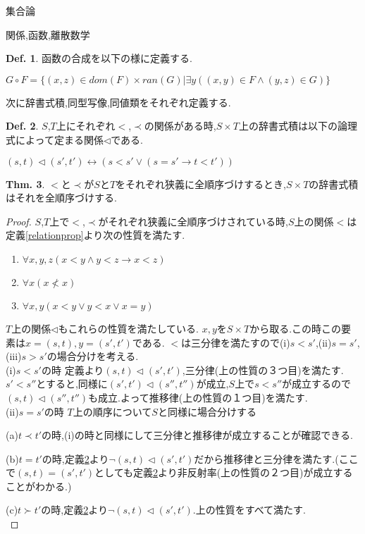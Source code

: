 \documentclass[14pt]{jsarticle}
\theoremstyle{definition}
\newtheorem{dfn}{Def.}[subsection]
\newtheorem{thm}[dfn]{Thm.}
\begin{document}
\begin{section}{集合論}
\begin{subsection}{関係,函数,離散数学}
\begin{dfn}
\label{funccomp}
函数の合成を以下の様に定義する.\par
$G \circ F = \{(x,z)\in dom(F) \times ran(G)|\exists y((x,y)\in F \land (y,z) \in G)\}$
\end{dfn}
次に辞書式積,同型写像,同値類をそれぞれ定義する.
\begin{dfn}
\label{dictcardef}
$S$,$T$上にそれぞれ$<$,$\prec$の関係がある時,$S\times T$上の辞書式積は以下の論理式によって定まる関係$\triangleleft$である.\par
$(s,t) \triangleleft (s',t') \leftrightarrow (s<s' \lor(s=s'\to t<t'))$
\end{dfn}
\begin{thm}
\label{dictstrict}
$<$と$\prec$が$S$と$T$をそれぞれ狭義に全順序づけするとき,$S\times T$の辞書式積はそれを全順序づけする.
\end{thm}
\begin{proof}
$S$,$T$上で$<$,$\prec$がそれぞれ狭義に全順序づけされている時,$S$上の関係$<$は定義\ref{relationprop}より次の性質を満たす.
\begin{enumerate}
	\item $\forall x,y,z(x<y \land y<z \to x<z)$
	\item $\forall x(x \not < x)$
	\item $\forall x,y(x<y \lor y<x \lor x=y)$
\end{enumerate}
$T$上の関係$\triangleleft$もこれらの性質を満たしている.
$x,y$を$S \times T$から取る.この時この要素は$x=(s,t),y=(s',t')$である.
$<$は三分律を満たすので(i)$s<s'$,(ii)$s=s'$,(iii)$s>s'$の場合分けを考える.\\
(i)$s<s'$の時
定義より$(s,t) \triangleleft(s',t')$,三分律(上の性質の３つ目)を満たす.
$s'<s''$とすると,同様に$(s',t') \triangleleft (s'',t'')$が成立,$S$上で$s<s''$が成立するので$(s,t) \triangleleft (s'',t'')$も成立.よって推移律(上の性質の１つ目)を満たす.\\
(ii)$s=s'$の時
$T$上の順序について$S$と同様に場合分けする\par
(a)$t\prec t'$の時,(i)の時と同様にして三分律と推移律が成立することが確認できる.\par
(b)$t=t'$の時,定義\ref{dictcardef}より$\lnot (s,t) \triangleleft (s',t')$だから推移律と三分律を満たす.(ここで$(s,t)=(s',t')$としても定義\ref{dictcardef}より非反射率(上の性質の２つ目)が成立することがわかる.)\par
(c)$t\succ t'$の時,定義\ref{dictcardef}より$\lnot (s,t) \triangleleft (s',t')$.上の性質をすべて満たす.\\

\end{proof}
\end{subsection}
\end{section}
\end{document}
